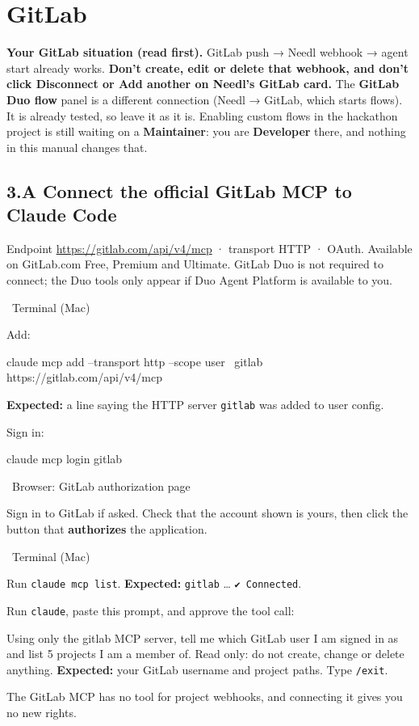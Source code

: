 \documentclass[11pt,a4paper]{article}
\newcommand{\ui}[1]{\textbf{#1}}
\newcommand{\where}[1]{\par\smallskip\noindent\colorbox{winbg}{\color{winfg}\bfseries\strut\ #1\ }\par\nopagebreak[4]}
\newcommand{\lit}[1]{\texttt{#1}}
\newenvironment{warn}{\def\FrameCommand{\fboxsep=6pt\colorbox{warnbg}}\MakeFramed{\advance\hsize-\width\FrameRestore}}{\endMakeFramed}
\newenvironment{prompt}{\def\FrameCommand{\fboxsep=6pt\fcolorbox{Gray}{okbg}}\MakeFramed{\advance\hsize-\width\FrameRestore}\raggedright}{\endMakeFramed}
\begin{document}
\section{GitLab}
\begin{warn}
\textbf{Your GitLab situation (read first).} GitLab push → Needl webhook → agent start already works. \textbf{Don't create, edit or delete that webhook, and don't click Disconnect or Add another on Needl's GitLab card.} The \ui{GitLab Duo flow} panel is a different connection (Needl → GitLab, which starts flows). It is already tested, so leave it as it is. Enabling custom flows in the hackathon project is still waiting on a \textbf{Maintainer}: you are \textbf{Developer} there, and nothing in this manual changes that.
\end{warn}

\subsection*{3.A Connect the official GitLab MCP to Claude Code}
Endpoint \url{https://gitlab.com/api/v4/mcp} · transport HTTP · OAuth. Available on GitLab.com Free, Premium and Ultimate. GitLab Duo is not required to connect; the Duo tools only appear if Duo Agent Platform is available to you.
\where{Terminal (Mac)}
\begin{steps}
\item Add:
\begin{cmd}
claude mcp add --transport http --scope user \
  gitlab https://gitlab.com/api/v4/mcp
\end{cmd}
\textbf{Expected:} a line saying the HTTP server \lit{gitlab} was added to user config.
\item Sign in:
\begin{cmd}
claude mcp login gitlab
\end{cmd}
\where{Browser: GitLab authorization page}
\item Sign in to GitLab if asked. Check that the account shown is yours, then click the button that \textbf{authorizes} the application.
\where{Terminal (Mac)}
\item Run \lit{claude mcp list}. \textbf{Expected:} \lit{gitlab} … \lit{✔ Connected}.
\item Run \lit{claude}, paste this prompt, and approve the tool call:
\begin{prompt}
Using only the gitlab MCP server, tell me which GitLab user I am signed in as and list 5 projects I am a member of. Read only: do not create, change or delete anything.
\end{prompt}
\textbf{Expected:} your GitLab username and project paths. Type \lit{/exit}.
\end{steps}
The GitLab MCP has no tool for project webhooks, and connecting it gives you no new rights.
\end{document}
